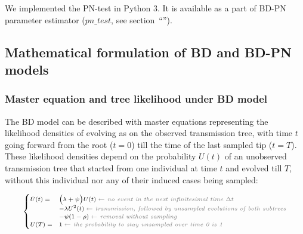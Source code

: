 \documentclass[10pt,letterpaper]{article}
\begin{document}


We implemented the PN-test in Python 3. It is available as a part of BD-PN parameter estimator ($pn\_test$, see section~``'').

 

\subsection*{Mathematical formulation of BD and BD-PN models}\label{math}


\subsubsection*{Master equation and tree likelihood under BD model}
The BD model can be described with master equations representing the likelihood densities of evolving as on the observed transmission tree, with time $t$ going forward from the root ($t=0$) till the time of the last sampled tip ($t=T$). These likelihood densities depend on the probability $U(t)$ of an unobserved transmission tree that started from one individual at time $t$ and evolved till $T$, without this individual nor any of their induced cases being sampled: 

\begin{equation}
\scriptsize
\begin{cases}
\dot{U}(t) = &\Big(\lambda + \psi\Big) U(t)\; \textit{\color{gray} $\leftarrow$ no event in the next infinitesimal time $\Delta t$ }\\
    &- \lambda U^2(t) \;  \textit{\color{gray} $\leftarrow$ transmission, followed by unsampled evolutions of both subtrees}\\
    &- \psi (1 - \rho)\;  \textit{\color{gray} $\leftarrow$ removal without sampling}\\
U(T) = & 1\;  \textit{\color{gray} $\leftarrow$ the probability to stay unsampled over time 0 is 1} \label{eq:Us}
\end{cases}
\end{equation}
\end{document}
